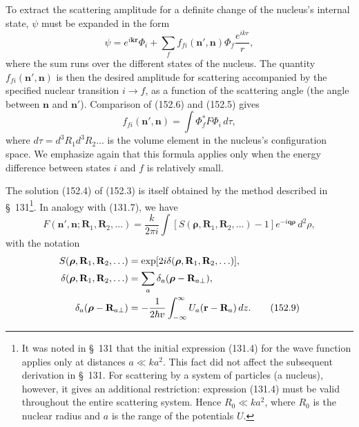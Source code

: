 To extract the scattering amplitude for a definite change of the nucleus's internal state, $\psi$ must be expanded in the form
\begin{equation}
 \psi=e^{i\mathbf k\mathbf r}\Phi_i+\sum_f f_{fi}(\mathbf n',\mathbf n)\Phi_f\frac{e^{ikr}}r,
 \tag{152.6}
\end{equation}
where the sum runs over the different states of the nucleus. The quantity $f_{fi}(\mathbf n',\mathbf n)$ is then the desired amplitude for scattering accompanied by the specified nuclear transition $i\to f$, as a function of the scattering angle (the angle between $\mathbf n$ and $\mathbf n'$). Comparison of (152.6) and (152.5) gives
\begin{equation}
 f_{fi}(\mathbf n',\mathbf n)=\int\Phi_f^*F\Phi_i\,d\tau,
 \tag{152.7}
\end{equation}
where $d\tau=d^3R_1d^3R_2\ldots$ is the volume element in the nucleus's configuration space. We emphasize again that this formula applies only when the energy difference between states $i$ and $f$ is relatively small.

The solution (152.4) of (152.3) is itself obtained by the method described in §~131\footnote{It was noted in §~131 that the initial expression (131.4) for the wave function applies only at distances $a\ll ka^2$. This fact did not affect the subsequent derivation in §~131. For scattering by a system of particles (a nucleus), however, it gives an additional restriction: expression (131.4) must be valid throughout the entire scattering system. Hence $R_0\ll ka^2$, where $R_0$ is the nuclear radius and $a$ is the range of the potentials $U$.}. In analogy with (131.7), we have
\begin{equation}
 F(\mathbf n',\mathbf n;\mathbf R_1,\mathbf R_2,\ldots)
 =\frac{k}{2\pi i}\int[S(\boldsymbol\rho,\mathbf R_1,\mathbf R_2,\ldots)-1]
 e^{-i\mathbf q\boldsymbol\rho}\,d^2\rho,
 \tag{152.8}
\end{equation}
with the notation
\begin{align}
 S(\boldsymbol\rho,\mathbf R_1,\mathbf R_2,\ldots)&=\exp[2i\delta(\boldsymbol\rho,\mathbf R_1,\mathbf R_2,\ldots)],\notag\\
 \delta(\boldsymbol\rho,\mathbf R_1,\mathbf R_2,\ldots)&=\sum_a\delta_a(\boldsymbol\rho-\mathbf R_{a\perp}),\notag\\
 \delta_a(\boldsymbol\rho-\mathbf R_{a\perp})&=-\frac1{2\hbar v}\int_{-\infty}^{\infty}U_a(\mathbf r-\mathbf R_a)\,dz.
 \tag{152.9}
\end{align}

